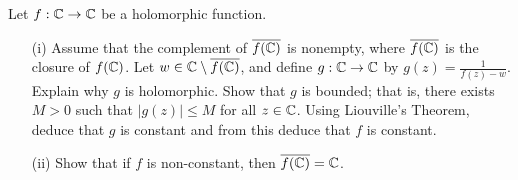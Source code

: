 \documentclass[a4paper]{article}
\begin{document}
\begin{problem}
   Let \( f: \mathbb{C} \to \mathbb{C}  \) be a holomorphic function. 
   \begin{enumerate}
       \item[(i)] Assume that the complement of \( \overline{f(\mathbb{C})} \) is nonempty, where \( \overline{f(\mathbb{C})} \) is the closure of \( f(\mathbb{C}) \). Let \( w \in \mathbb{C} \setminus  \overline{f(\mathbb{C})} \), and define \( g: \mathbb{C} \to \mathbb{C}  \) by \( g(z) = \frac{ 1  }{  f(z) - w  }  \). Explain why \( g  \) is holomorphic. Show that \( g  \) is bounded; that is, there exists \( M  > 0  \) such that \( | g(z) | \leq M  \) for all \( z \in \mathbb{C}  \). Using Liouville's Theorem, deduce that \( g  \) is constant and from this deduce that \( f  \) is constant.
        \item[(ii)] Show that if \( f  \) is non-constant, then \( \overline{f(\mathbb{C})} = \mathbb{C}  \). 
   \end{enumerate}
\end{problem}
\end{document}
